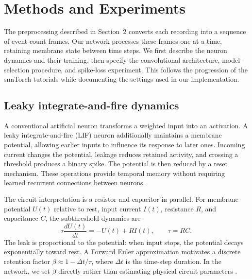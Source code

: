 \section{Methods and Experiments}
\label{sec:methods}

The preprocessing described in Section~2 converts each recording into a sequence of event-count frames. Our network processes these frames one at a time, retaining membrane state between time steps. We first describe the neuron dynamics and their training, then specify the convolutional architecture, model-selection procedure, and spike-loss experiment. This follows the progression of the snnTorch tutorials while documenting the settings used in our implementation.

\subsection{Leaky integrate-and-fire dynamics}

A conventional artificial neuron transforms a weighted input into an activation. A leaky integrate-and-fire (LIF) neuron additionally maintains a membrane potential, allowing earlier inputs to influence its response to later ones. Incoming current changes the potential, leakage reduces retained activity, and crossing a threshold produces a binary spike. The potential is then reduced by a reset mechanism. These operations provide temporal memory without requiring learned recurrent connections between neurons.

The circuit interpretation is a resistor and capacitor in parallel. For membrane potential $U(t)$ relative to rest, input current $I(t)$, resistance $R$, and capacitance $C$, the subthreshold dynamics are
\begin{equation}
    \tau \frac{dU(t)}{dt} = -U(t) + RI(t),
    \qquad \tau = RC.
    \label{eq:lif-circuit}
\end{equation}
The leak is proportional to the potential: when input stops, the potential decays exponentially toward rest. A Forward Euler approximation motivates a discrete retention factor $\beta \approx 1-\Delta t/\tau$, where $\Delta t$ is the time-step duration. In the network, we set $\beta$ directly rather than estimating physical circuit parameters \citep{snntorchTutorial2}.

